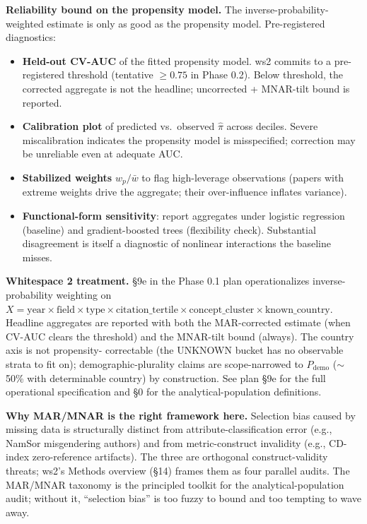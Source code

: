 \documentclass[11pt]{article}
\begin{document}
\textbf{Reliability bound on the propensity model.} The
inverse-probability-weighted estimate is only as good as the
propensity model. Pre-registered diagnostics:
\begin{itemize}[nosep]
  \item \textbf{Held-out CV-AUC} of the fitted propensity model.
        ws2 commits to a pre-registered threshold (tentative $\geq 0.75$
        in Phase 0.2). Below threshold, the corrected aggregate is not
        the headline; uncorrected + MNAR-tilt bound is reported.
  \item \textbf{Calibration plot} of predicted vs.\ observed $\hat\pi$
        across deciles. Severe miscalibration indicates the propensity
        model is misspecified; correction may be unreliable even at
        adequate AUC.
  \item \textbf{Stabilized weights} $w_p / \bar w$ to flag
        high-leverage observations (papers with extreme weights drive
        the aggregate; their over-influence inflates variance).
  \item \textbf{Functional-form sensitivity}: report aggregates under
        logistic regression (baseline) and gradient-boosted trees
        (flexibility check). Substantial disagreement is itself a
        diagnostic of nonlinear interactions the baseline misses.
\end{itemize}

\textbf{Whitespace 2 treatment.} \S9e in the Phase 0.1 plan
operationalizes inverse-probability weighting on
$X = \text{year} \times \text{field} \times \text{type} \times
\text{citation\_tertile} \times \text{concept\_cluster} \times
\text{known\_country}$. Headline aggregates are reported with both
the MAR-corrected estimate (when CV-AUC clears the threshold) and
the MNAR-tilt bound (always). The country axis is not propensity-
correctable (the UNKNOWN bucket has no observable strata to fit on);
demographic-plurality claims are scope-narrowed to $P_{\text{demo}}$
($\sim$50\% with determinable country) by construction. See plan
\S9e for the full operational specification and \S0 for the
analytical-population definitions.

\textbf{Why MAR/MNAR is the right framework here.} Selection bias
caused by missing data is structurally distinct from
attribute-classification error (e.g., NamSor misgendering authors)
and from metric-construct invalidity (e.g., CD-index zero-reference
artifacts). The three are orthogonal construct-validity threats;
ws2's Methods overview (\S14) frames them as four parallel audits.
The MAR/MNAR taxonomy is the principled toolkit for the
analytical-population audit; without it, ``selection bias'' is too
fuzzy to bound and too tempting to wave away.
\end{document}

